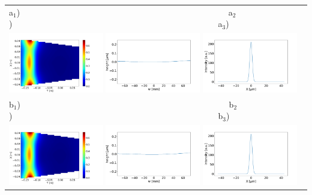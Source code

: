 \documentclass[aps,pra,showpacs,twocolumn,amsmath,amssymb,superscriptaddress,nofootinbib]{revtex4}
\begin{document}
\thispagestyle{empty}


  \begin{center}
   \begin{tabular}{l}
   a$_1$)~~~~~~~~~~~~~~~~~~~~~~~~~~~~~~~~~~~~~~~~~~~~~~~~~
   a$_2$)~~~~~~~~~~~~~~~~~~~~~~~~~~~~~~~~~~~~~~~~~~~~~~~~~a$_3$)\\
   \includegraphics[width=0.32\textwidth]{figures/cryogenic2d.pdf}
   \includegraphics[width=0.32\textwidth]{figures/deformation1.pdf}
   \includegraphics[width=0.32\textwidth]{figures/intensity1.pdf} \\

  b$_1$)~~~~~~~~~~~~~~~~~~~~~~~~~~~~~~~~~~~~~~~~~~~~~~~~~
  b$_2$)~~~~~~~~~~~~~~~~~~~~~~~~~~~~~~~~~~~~~~~~~~~~~~~~~b$_3$)\\
  \includegraphics[width=0.32\textwidth]{figures/cryogenic2dKh.pdf}
  \includegraphics[width=0.32\textwidth]{figures/deformation2.pdf}
  \includegraphics[width=0.32\textwidth]{figures/intensity2.pdf} \\


\end{tabular}
\end{center}
\end{document}
